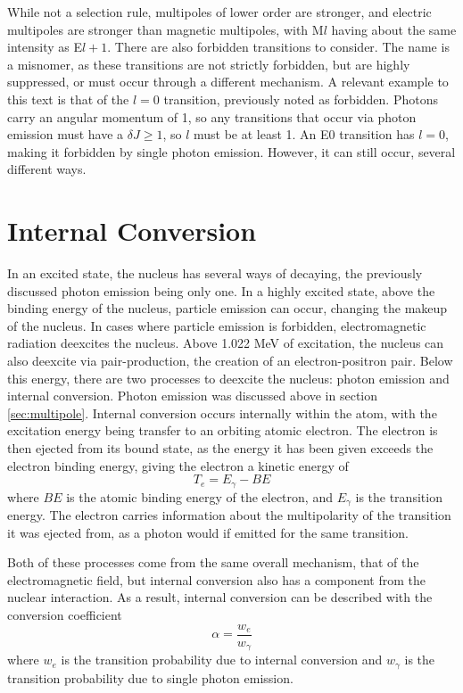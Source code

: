 While not a selection rule, multipoles of lower order are stronger, and electric multipoles are stronger than magnetic multipoles, with M$l$ having about the same intensity as E$l+1$. There are also forbidden transitions to consider. The name is a misnomer, as these transitions are not strictly forbidden, but are highly suppressed, or must occur through a different mechanism. A relevant example to this text is that of the $l=0$ transition, previously noted as forbidden. Photons carry an angular momentum of 1, so any transitions that occur via photon emission must have a $\delta J \geq 1$, so $l$ must be at least 1. An E0 transition has $l=0$, making it forbidden by single photon emission. However, it can still occur, several different ways.

\section{Internal Conversion}

In an excited state, the nucleus has several ways of decaying, the previously discussed photon emission being only one. In a highly excited state, above the binding energy of the nucleus, particle emission can occur, changing the makeup of the nucleus. In cases where particle emission is forbidden, electromagnetic radiation deexcites the nucleus. Above 1.022 MeV of excitation, the nucleus can also deexcite via pair-production, the creation of an electron-positron pair. Below this energy, there are two processes to deexcite the nucleus: photon emission and internal conversion. Photon emission was discussed above in section \ref{sec:multipole}. Internal conversion occurs internally within the atom, with the excitation energy being transfer to an orbiting atomic electron. The electron is then ejected from its bound state, as the energy it has been given exceeds the electron binding energy, giving the electron a kinetic energy of 
\begin{equation}
    T_e = E_{\gamma}-BE
\end{equation} 
where $BE$ is the atomic binding energy of the electron, and $E_{\gamma}$ is the transition energy. The electron carries information about the multipolarity of the transition it was ejected from, as a photon would if emitted for the same transition.

Both of these processes come from the same overall mechanism, that of the electromagnetic field, but internal conversion also has a component from the nuclear interaction. As a result, internal conversion can be described with the conversion coefficient
\begin{equation}
\label{eq:conv_coeff}
    \alpha = \frac{w_e}{w_\gamma}
\end{equation}
where $w_e$ is the transition probability due to internal conversion and $w_\gamma$ is the transition probability due to single photon emission.


